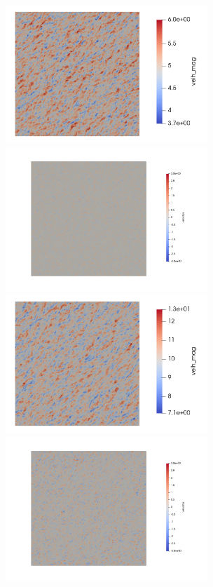 \begin{figure}[hbt!]
  \centering
   \\
  \includegraphics[width=3.0in]{figures/snapshots/05ms/velh_mag_z20.png}
  \includegraphics[width=3.0in]{figures/snapshots/05ms/velz_z20_samelimits.png} \\
  
  \includegraphics[width=3.0in]{figures/snapshots/10ms/velh_mag_z20.png}
  \includegraphics[width=3.0in]{figures/snapshots/10ms/velz_z20_samelimits.png} \\
  

\end{figure}
